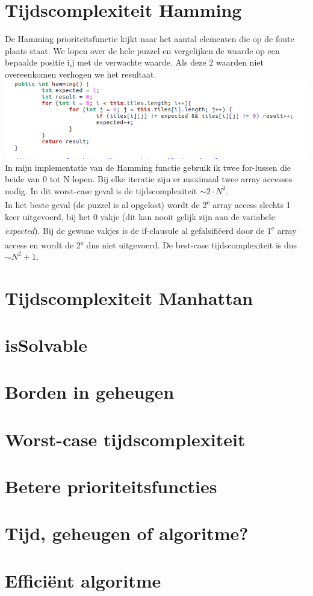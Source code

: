 \documentclass[11pt, a4paper]{article}
\begin{document}
\section*{Tijdscomplexiteit Hamming}
De Hamming prioriteitsfunctie kijkt naar het aantal elementen die op de foute plaats staat. We lopen over de hele puzzel en vergelijken de waarde op een bepaalde positie i,j met de verwachte waarde. Als deze 2 waarden niet overeenkomen verhogen we het resultaat.\\
\includegraphics[width=\textwidth]{hamming}\\
In mijn implementatie van de Hamming functie gebruik ik twee for-lussen die beide van 0 tot N lopen. Bij elke iteratie zijn er maximaal twee array accesses nodig. In dit worst-case geval is de tijdscomplexiteit $\sim 2\cdot N^2$.\\
In het beste geval (de puzzel is al opgelost) wordt de 2\textsuperscript{e} array access slechts 1 keer uitgevoerd, bij het 0 vakje (dit kan nooit gelijk zijn aan de variabele \emph{expected}). Bij de gewone vakjes is de if-clausule al gefalsifi\"eerd door de 1\textsuperscript{e} array access en wordt de 2\textsuperscript{e} dus niet uitgevoerd. De best-case tijdscomplexiteit is dus $\sim N^2 + 1$.
\section*{Tijdscomplexiteit Manhattan}
\section*{isSolvable}
\section*{Borden in geheugen}
\section*{Worst-case tijdscomplexiteit}
\section*{Betere prioriteitsfuncties}
\section*{Tijd, geheugen of algoritme?}
\section*{Effici\"ent algoritme}
\end{document}
